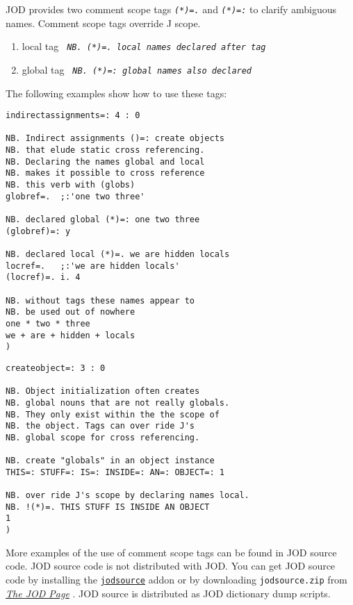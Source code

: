   JOD provides two comment scope tags
   \textcolor{CodeComment}{\texttt{\textsl{(*)=.}}} and
  \textcolor{CodeComment}{\texttt{\textsl{(*)=:}}} to clarify ambiguous names.  Comment
  scope tags override J scope.  

\begin{enumerate}
	\item local tag \textcolor{CodeComment}{\texttt{\textsl{ NB. (*)=. local names declared after tag}}}
	\item global tag \textcolor{CodeComment}{\texttt{\textsl{ NB. (*)=: global names also declared}}}
\end{enumerate}
  
   The following examples show how to use these tags:

\begin{lstlisting}[frame=single,framerule=0pt]  
indirectassignments=: 4 : 0

NB. Indirect assignments ()=: create objects 
NB. that elude static cross referencing. 
NB. Declaring the names global and local
NB. makes it possible to cross reference 
NB. this verb with (globs)
globref=.  ;:'one two three'

NB. declared global (*)=: one two three
(globref)=: y     

NB. declared local (*)=. we are hidden locals
locref=.   ;:'we are hidden locals'
(locref)=. i. 4  

NB. without tags these names appear to
NB. be used out of nowhere 
one * two * three
we + are + hidden + locals
)
\end{lstlisting}

     
\begin{lstlisting}[frame=single,framerule=0pt]    
createobject=: 3 : 0

NB. Object initialization often creates
NB. global nouns that are not really globals.
NB. They only exist within the the scope of
NB. the object. Tags can over ride J's 
NB. global scope for cross referencing.

NB. create "globals" in an object instance
THIS=: STUFF=: IS=: INSIDE=: AN=: OBJECT=: 1

NB. over ride J's scope by declaring names local.
NB. !(*)=. THIS STUFF IS INSIDE AN OBJECT
1
)
\end{lstlisting}

    More examples of the use of comment scope tags can be found in 
      JOD source code.  JOD source code is not 
     distributed with JOD.  You can get JOD source code by installing
     the  \href{http://www.jsoftware.com/jwiki/Addons/general/jodsource}{\texttt{jodsource}}
     addon or by downloading \verb|jodsource.zip| from 
     \href{http://bakerjd99.wordpress.com/the-jod-page/}{\emph{The JOD Page}} \cite{baker:jodpages}.  
     JOD source is distributed as JOD dictionary dump scripts.

